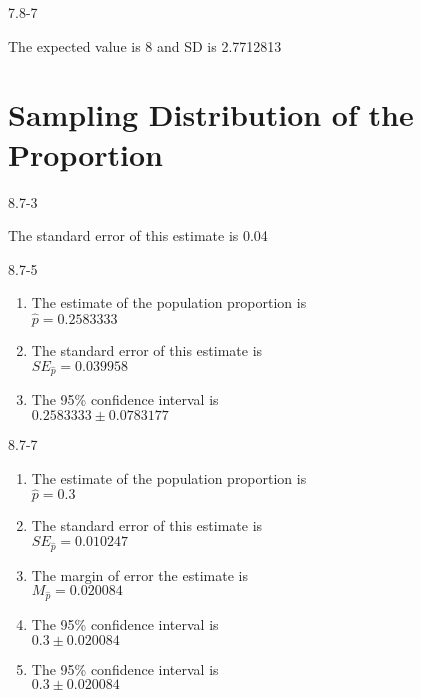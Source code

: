 \begin{exsol@solution}{7.8-7}

The expected value is 8 and SD is 2.7712813
\end{exsol@solution}
\setcounter{chapter}{8}\chapter{Sampling Distribution of the Proportion}
\begin{exsol@solution}{8.7-3}

The standard error of this estimate is 0.04

\end{exsol@solution}
\begin{exsol@solution}{8.7-5}

\begin{enumerate}
\item	The estimate of the population proportion is \\ $ = 0.2583333$
\item	The standard error of this estimate is \\ $SE_{} = 0.039958$
\item	The 95\% confidence interval is \\ $0.2583333 $
\end{enumerate}
\end{exsol@solution}
\begin{exsol@solution}{8.7-7}

\begin{enumerate}
\item	The estimate of the population proportion is \\ $ = 0.3$
\item	The standard error of this estimate is \\ $SE_{} = 0.010247$
\item The margin of error the estimate is \\ $M_{} = 0.020084$
\item	The 95\% confidence interval is \\ $0.3 $
\item	The 95\% confidence interval is \\ $0.3 $
\end{enumerate}
\end{exsol@solution}

